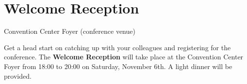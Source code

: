 \clearpage
\section[Welcome Reception]{Welcome Reception}
\setheaders{}{\daydateyear}

\begin{center}


Convention Center Foyer (conference venue)\\
\end{center}


\noindent Get a head start on catching up with your colleagues and registering for the conference.
The \textbf{Welcome Reception} will take place at the Convention Center Foyer from 18:00 to 20:00 on Saturday, November 6th.
A light dinner will be provided.
